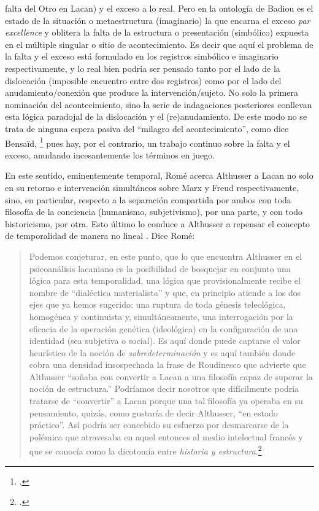 falta del Otro en Lacan) y el exceso a lo real. Pero en la ontología de Badiou es el estado de la situación o metaestructura (imaginario) la que encarna el exceso \emph{par excellence} y oblitera la falta de la estructura o presentación (simbólico) expuesta en el múltiple singular o sitio de acontecimiento. Es decir que aquí el problema de la falta y el exceso está formulado en los registros simbólico e imaginario respectivamente, y lo real bien podría ser pensado tanto por el lado de la dislocación (imposible encuentro entre dos registros) como por el lado del anudamiento/conexión que produce la intervención/sujeto. No solo la primera nominación del acontecimiento, sino la serie de indagaciones posteriores conllevan esta lógica paradojal de la dislocación y el (re)anudamiento. De este modo no se trata de ninguna espera pasiva del \enquote{milagro del acontecimiento}, como dice Bensaïd, \footcite[][]{@7150-BENSAID2001}
pues hay, por el contrario, un trabajo continuo sobre la falta y el exceso, anudando incesantemente los términos en juego.

En este sentido, eminentemente temporal, Romé acerca Althusser a Lacan no solo en su retorno e intervención simultáneos sobre Marx y Freud respectivamente, sino, en particular, respecto a la separación compartida por ambos con toda filosofía de la conciencia (humanismo, subjetivismo), por una parte, y con todo historicismo, por otra. Esto último lo conduce a Althusser a repensar el concepto de temporalidad de manera no lineal . Dice Romé:

\begin{quote}
Podemos conjeturar, en este punto, que lo que encuentra Althusser en el psicoanálisis lacaniano es la posibilidad de bosquejar en conjunto una lógica para esta temporalidad, una lógica que provisionalmente recibe el nombre de \enquote{dialéctica materialista} y que, en principio atiende a los dos ejes que ya hemos sugerido: una ruptura de toda génesis teleológica, homogénea y continuista y, simultáneamente, una interrogación por la eficacia de la operación genética (ideológica) en la configuración de una identidad (sea subjetiva o social). Es aquí donde puede captarse el valor heurístico de la noción de \emph{sobredeterminación} y es aquí también donde cobra una densidad insospechada la frase de Roudinesco que advierte que Althusser \enquote{soñaba con convertir a Lacan a una filosofía capaz de superar la noción de estructura.} Podríamos decir nosotros que difícilmente podría tratarse de \enquote{convertir} a Lacan porque una tal filosofía ya operaba en su pensamiento, quizás, como gustaría de decir Althusser, \enquote{en estado práctico}. Así podría ser concebido su esfuerzo por desmarcarse de la polémica que atravesaba en aquel entonces al medio intelectual francés y que se conocía como la dicotomía entre \emph{historia y estructura}.\footcite[][]{@7075-ROME2009}
\end{quote}

